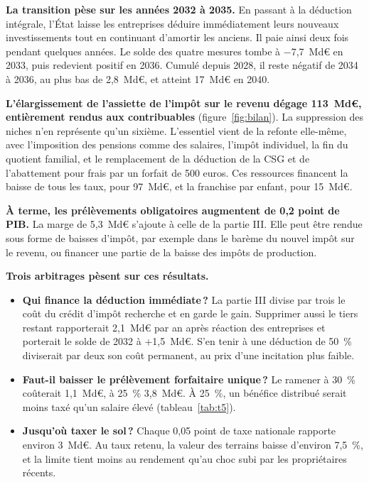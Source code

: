 \documentclass[10pt,a4paper]{article}
\begin{document}
\textbf{La transition pèse sur les années 2032 à 2035.} En passant à la déduction intégrale, l'État laisse les
entreprises déduire immédiatement leurs nouveaux investissements tout en continuant d'amortir les anciens. Il paie
ainsi deux fois pendant quelques années. Le solde des quatre mesures tombe à $-$7,7~Md€ en 2033, puis redevient positif
en 2036. Cumulé depuis 2028, il reste négatif de 2034 à 2036, au plus bas de 2,8~Md€, et atteint 17~Md€ en 2040.


\textbf{L'élargissement de l'assiette de l'impôt sur le revenu dégage 113~Md€, entièrement rendus aux contribuables}
(figure~\ref{fig:bilan}). La suppression des niches n'en représente qu'un sixième. L'essentiel vient de la refonte
elle-même, avec l'imposition des pensions comme des salaires, l'impôt individuel, la fin du quotient familial, et le
remplacement de la déduction de la CSG et de l'abattement pour frais par un forfait de 500 euros. Ces ressources
financent la baisse de tous les taux, pour 97~Md€, et la franchise par enfant, pour 15~Md€.

\textbf{À terme, les prélèvements obligatoires augmentent de 0,2 point de PIB.} La marge de 5,3~Md€ s'ajoute à celle
de la partie III. Elle peut être rendue sous forme de baisses d'impôt, par exemple dans le barème du nouvel impôt sur le
revenu, ou financer une partie de la baisse des impôts de production.

\textbf{Trois arbitrages pèsent sur ces résultats.}
\begin{itemize}[leftmargin=12pt,itemsep=1pt,topsep=1pt]
\item \textbf{Qui finance la déduction immédiate\,?} La partie III divise par trois le coût du crédit d'impôt recherche et
en garde le gain. Supprimer aussi le tiers restant rapporterait 2,1~Md€ par an après réaction des entreprises et
porterait le solde de 2032 à +1,5~Md€. S'en tenir à une déduction de 50~\% diviserait par deux son coût permanent, au
prix d'une incitation plus faible.
\item \textbf{Faut-il baisser le prélèvement forfaitaire unique\,?} Le ramener à 30~\% coûterait 1,1~Md€, à 25~\% 3,8~Md€.
À 25~\%, un bénéfice distribué serait moins taxé qu'un salaire élevé (tableau~\ref{tab:t5}).
\item \textbf{Jusqu'où taxer le sol\,?} Chaque 0,05 point de taxe nationale rapporte environ 3~Md€. Au taux retenu, la
valeur des terrains baisse d'environ 7,5~\%, et la limite tient moins au rendement qu'au choc subi par les propriétaires
récents.
\end{itemize}
\end{document}
